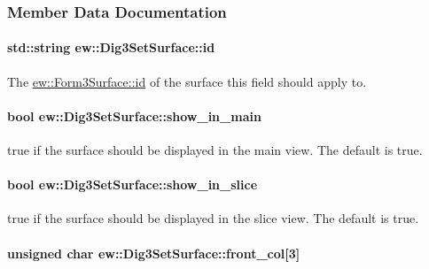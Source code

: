 \subsubsection{Member Data Documentation}
\hypertarget{classew_1_1Dig3SetSurface_aef9a8a1de88c69d590443a7fabb16f7c}{
\paragraph[{id}]{\setlength{\rightskip}{0pt plus 5cm}std::string {\bf ew::Dig3SetSurface::id}}\hfill}
\label{classew_1_1Dig3SetSurface_aef9a8a1de88c69d590443a7fabb16f7c}
The \hyperlink{classew_1_1Form3Surface_aa207964ce409cd2cd7b0d4a02ad18d5a}{ew::Form3Surface::id} of the surface this field should apply to. \hypertarget{classew_1_1Dig3SetSurface_ad71bb9c721004e888f70c89d90fd6016}{
\paragraph[{show\_\-in\_\-main}]{\setlength{\rightskip}{0pt plus 5cm}bool {\bf ew::Dig3SetSurface::show\_\-in\_\-main}}\hfill}
\label{classew_1_1Dig3SetSurface_ad71bb9c721004e888f70c89d90fd6016}
{\ttfamily true} if the surface should be displayed in the main view. The default is {\ttfamily true}. \hypertarget{classew_1_1Dig3SetSurface_a11a98c149d5f62f0d5c3b2230be82dfa}{
\paragraph[{show\_\-in\_\-slice}]{\setlength{\rightskip}{0pt plus 5cm}bool {\bf ew::Dig3SetSurface::show\_\-in\_\-slice}}\hfill}
\label{classew_1_1Dig3SetSurface_a11a98c149d5f62f0d5c3b2230be82dfa}
{\ttfamily true} if the surface should be displayed in the slice view. The default is {\ttfamily true}. \hypertarget{classew_1_1Dig3SetSurface_aa067f664f7409bdab4f31a2facfc981d}{
\paragraph[{front\_\-col}]{\setlength{\rightskip}{0pt plus 5cm}unsigned char {\bf ew::Dig3SetSurface::front\_\-col}\mbox{[}3\mbox{]}}\hfill}

